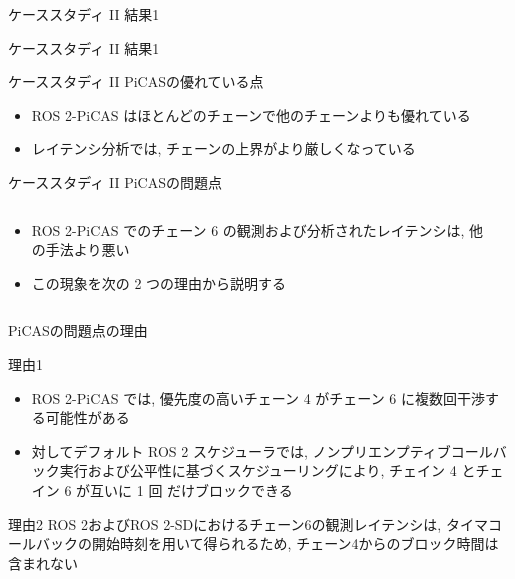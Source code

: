 \begin{frame}{ケーススタディ II 結果1}
\end{frame}

\begin{frame}{ケーススタディ II 結果1}
\end{frame}

\begin{frame}{ケーススタディ II PiCASの優れている点}
    \begin{itemize}
        \item ROS 2-PiCAS はほとんどのチェーンで他のチェーンよりも優れている
        \item レイテンシ分析では, チェーンの上界がより厳しくなっている
    \end{itemize}
\end{frame}

\begin{frame}{ケーススタディ II PiCASの問題点}
    \begin{columns}
        \begin{column}{0.8\textwidth}
            \begin{itemize}
                \item ROS 2-PiCAS でのチェーン 6 の観測および分析されたレイテンシは, 他の手法より悪い
                \item この現象を次の 2 つの理由から説明する
            \end{itemize}
        \end{column}
        \begin{column}{0.2\textwidth}
        \end{column}
    \end{columns}
\end{frame}

\begin{frame}{PiCASの問題点の理由}
    \vspace{1mm}
    \begin{block}{理由1}
        \setlength{\linewidth}{0.98\columnwidth}
        \begin{itemize}
            \item ROS 2-PiCAS では, 優先度の高いチェーン 4 がチェーン 6 に複数回干渉する可能性がある
            \item 対してデフォルト ROS 2 スケジューラでは, ノンプリエンプティブコールバック実行および公平性に基づくスケジューリングにより, チェイン 4 とチェイン 6 が互いに 1 回 だけブロックできる
        \end{itemize}
    \end{block}
    \begin{block}{理由2}
        ROS 2およびROS 2-SDにおけるチェーン6の観測レイテンシは, タイマコールバックの開始時刻を用いて得られるため, チェーン4からのブロック時間は含まれない
    \end{block}
\end{frame}

